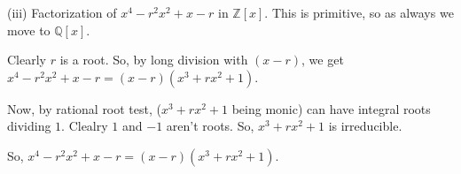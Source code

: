\documentclass[12pt,a4paper]{article}
\theoremstyle{definition}
\begin{document}
\begin{flushleft}
\bigskip
\bigskip

(iii) Factorization of $x^4 -r^2x^2 + x -r$ in $\mathbb{Z}[x]$. This is primitive, so as always we move to $\mathbb{Q}[x]$.

\medskip

Clearly $r$ is a root. So, by long division with $(x-r)$, we get $x^4 -r^2x^2 + x -r = (x-r)(x^3 + rx^2 +1)$.

Now, by rational root test, ($x^3 + rx^2 +1$ being monic) can have integral roots dividing $1$. Clealry $1$ and $-1$ aren't roots. So, $x^3 + rx^2 +1$ is irreducible.

\medskip

So, $x^4 -r^2x^2 + x -r=(x-r)(x^3 + rx^2 +1)$.

\end{flushleft}
\end{document}
